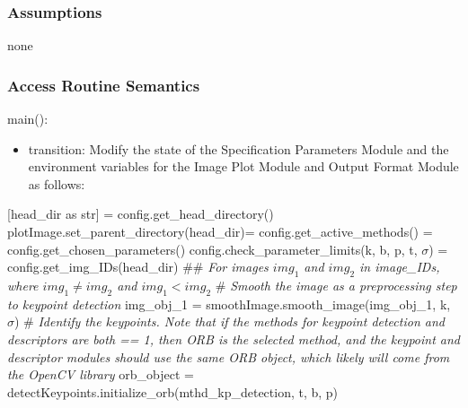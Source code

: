 \documentclass[12pt, titlepage]{article}
\begin{document}
\subsubsection{Assumptions}
none

\subsubsection{Access Routine Semantics}
\noindent main():
\begin{itemize}
\item transition: Modify the state of the Specification Parameters Module and the 
environment variables for the Image Plot Module and Output Format Module as follows:
\end{itemize}
[head\_dir as str] = config.get\_head\_directory() \newline
plotImage.set\_parent\_directory(head\_dir)\newline {} 
= config.get\_active\_methods() \newline \newline
[k, $\sigma$, t, b, p]
= config.get\_chosen\_parameters() \newline \newline
config.check\_parameter\_limits(k, b, p, t, $\sigma$) \newline {} = config.get\_img\_IDs(head\_dir) \newline \newline
\#\# \textit{For images $img_{1}$ and $img_{2}$ in image\_IDs, where $img_{1} \neq img_{2}$ and $img_{1} < img_{2}$}\newline
\# \textit{Smooth the image as a preprocessing step to keypoint detection} \newline
img\_obj\_1 = smoothImage.smooth\_image(img\_obj\_1, k, $\sigma$) \newline \newline
\# \textit{Identify the keypoints. Note that if the methods for keypoint detection and 
descriptors are both == 1, then ORB is the selected method, and the keypoint and descriptor 
modules should use the same ORB object, which likely will come from the OpenCV library}\newline \newline
orb\_object = detectKeypoints.initialize\_orb(mthd\_kp\_detection, t, b, p) \newline
\end{document}
